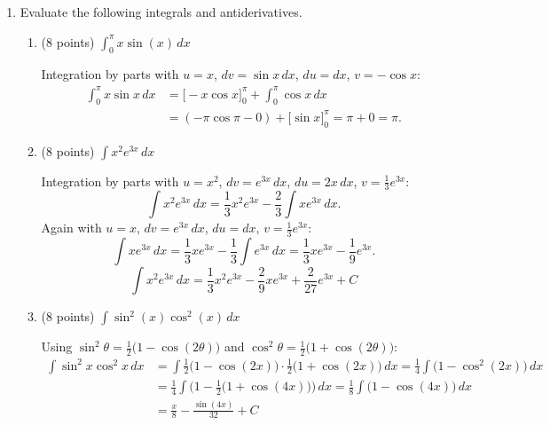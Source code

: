 \documentclass[12pt]{article}
\newcommand{\ds}{\displaystyle}
\begin{document}
\begin{enumerate}
    \newpage

\item Evaluate the following integrals and antiderivatives.
  \begin{enumerate}
  \item (8 points) $\ds \int_0^{\pi} x \sin(x) \, dx$
    \begin{solution}
      Integration by parts with $u = x$, $dv = \sin x\,dx$, $du = dx$, $v = -\cos x$:
      \begin{align*}
        \int_0^{\pi} x\sin x\,dx &= \Big[-x\cos x\Big]_0^{\pi} + \int_0^{\pi}\cos x\,dx \\[4pt]
          &= (-\pi\cos\pi - 0) + \Big[\sin x\Big]_0^{\pi} = \pi + 0 = \boxed{\pi}.
      \end{align*}
    \end{solution}
    \vfill

  \item (8 points) $\ds \int x^2 e^{3x} \, dx$
    \begin{solution}
      Integration by parts with $u = x^2$, $dv = e^{3x}\,dx$, $du = 2x\,dx$, $v = \tfrac13 e^{3x}$:
      \[
        \int x^2 e^{3x}\,dx = \frac13 x^2 e^{3x} - \frac23\int x e^{3x}\,dx.
      \]
      Again with $u = x$, $dv = e^{3x}\,dx$, $du = dx$, $v = \tfrac13 e^{3x}$:
      \[
        \int x e^{3x}\,dx = \frac13 x e^{3x} - \frac13\int e^{3x}\,dx = \frac13 x e^{3x} - \frac19 e^{3x}.
      \]
      \[
        \boxed{\int x^2 e^{3x}\,dx = \frac13 x^2 e^{3x} - \frac29 x e^{3x} + \frac{2}{27} e^{3x} + C}
      \]
    \end{solution}
    \vfill

    \newpage
  \item (8 points) $\ds \int \sin^2(x) \cos^2(x) \, dx$
    \begin{solution}
      Using $\sin^2\theta = \tfrac12\big(1-\cos(2\theta)\big)$ and $\cos^2\theta = \tfrac12\big(1+\cos(2\theta)\big)$:
      \begin{align*}
        \int \sin^2 x\cos^2 x\,dx
          &= \int \tfrac12\big(1-\cos(2x)\big)\cdot\tfrac12\big(1+\cos(2x)\big)\,dx
           = \frac14\int \big(1 - \cos^2(2x)\big)\,dx \\[4pt]
          &= \frac14\int \Big(1 - \tfrac12\big(1+\cos(4x)\big)\Big)\,dx
           = \frac18\int \big(1 - \cos(4x)\big)\,dx \\[4pt]
          &= \boxed{\frac{x}{8} - \frac{\sin(4x)}{32} + C}
      \end{align*}
    \end{solution}
    \vfill


\end{enumerate}
\end{enumerate}
\end{document}

